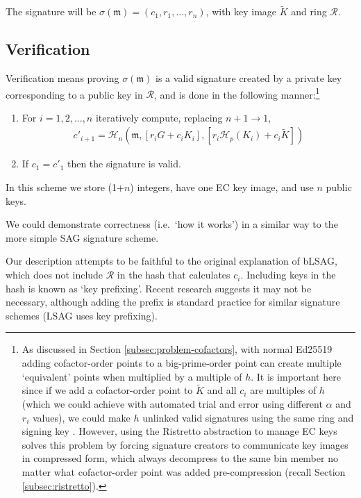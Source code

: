 The signature will be \(\sigma(\mathfrak{m}) = (c_1, r_1, ..., r_n)\), with key image $\tilde{K}$ and ring $\mathcal{R}$.


\subsection*{Verification}

Verification means proving $\sigma(\mathfrak{m})$ is a valid signature created by a private key corresponding to a public key in $\mathcal{R}$, and is done in the following manner:\footnote{As discussed in Section \ref{subsec:problem-cofactors}, with normal Ed25519 adding cofactor-order points to a big-prime-order point can create multiple `equivalent' points when multiplied by a multiple of $h$. It is important here since if we add a cofactor-order point to $\tilde{K}$ and all $c_i$ are multiples of $h$ (which we could achieve with automated trial and error using different $\alpha$ and $r_i$ values), we could make $h$ unlinked valid signatures using the same ring and signing key \cite{key-image-bug}. However, using the Ristretto abstraction to manage EC keys solves this problem by forcing signature creators to communicate key images in compressed form, which always decompress to the same bin member no matter what cofactor-order point was added pre-compression (recall Section \ref{subsec:ristretto}).}

\begin{enumerate}
	\item For \(i = 1, 2, ..., n\) iteratively compute, replacing \(n + 1 \rightarrow 1\),\vspace{.175cm}
	\begin{align*}
	c'_{i+1} = \mathcal{H}_n(\mathfrak{m}, [r_i G + c_i {K_i}], [r_i \mathcal{H}_p(K_i) + c_i \tilde{K}])
	\end{align*}

	\item If \(c_1 = c'_1\) then the signature is valid.
\end{enumerate}

In this scheme we store (1+$n$) integers, have one EC key image, and use $n$ public keys.

We could demonstrate correctness (i.e.\ `how it works') in a similar way to the more simple SAG signature scheme.

Our description attempts to be faithful to the original explanation of bLSAG, which does not include $\mathcal{R}$ in the hash that calculates $c_i$. Including keys in the hash is known as `key prefixing'. Recent research \cite{key-prefix-paper} suggests it may not be necessary, although adding the prefix is standard practice for similar signature schemes (LSAG uses key prefixing).


